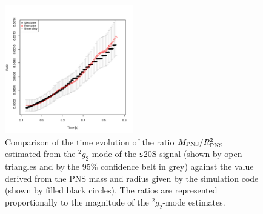 \begin{figure}
 \centering
 \includegraphics[width=0.5\textwidth]{plots/ratio}
 \caption{Comparison of the time evolution of the ratio $M_{\rm PNS}/R_{\rm PNS}^2$ estimated from the $\mbox{}^2 g_2$-mode of the {\texttt s20S} signal (shown by open triangles and by the 95\% confidence belt in grey) against the value derived from the PNS mass and radius given by the simulation code (shown by filled black circles).  The ratios  are represented proportionally to the magnitude of the $\mbox{}^2 g_2$-mode  estimates.}
 \label{fig:ratio}
\end{figure}


